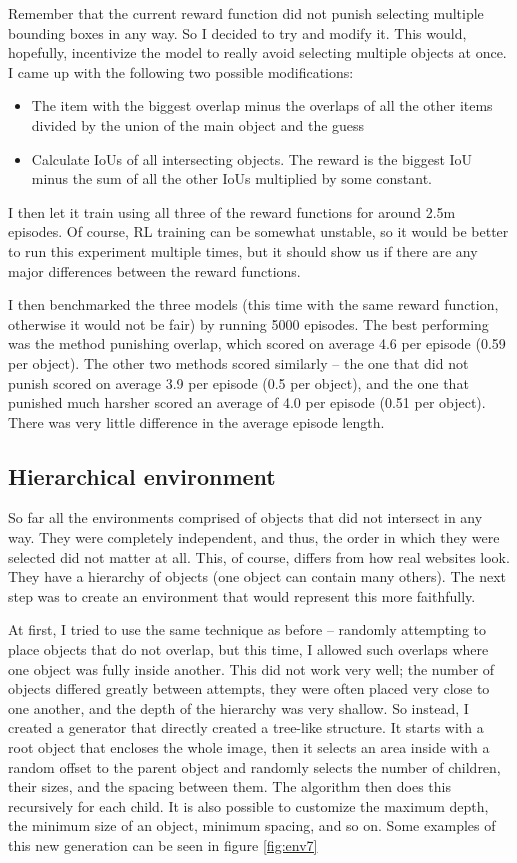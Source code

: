\documentclass[
  digital,     %
  oneside,     %
  nosansbold,  %
  nocolorbold, %
  lof,         %
  lot,         %
]{fithesis4}
\begin{document}
Remember that the current reward function did not punish selecting multiple bounding boxes in any way. So I decided to try and modify it. This would, hopefully, incentivize the model to really avoid selecting multiple objects at once. I came up with the following two possible modifications:
\begin{itemize}
    \item The item with the biggest overlap minus the overlaps of all the other items divided by the union of the main object and the guess
    \item Calculate IoUs of all intersecting objects. The reward is the biggest IoU minus the sum of all the other IoUs multiplied by some constant.
\end{itemize}

I then let it train using all three of the reward functions for around 2.5m episodes. Of course, RL training can be somewhat unstable, so it would be better to run this experiment multiple times, but it should show us if there are any major differences between the reward functions.

I then benchmarked the three models (this time with the same reward function, otherwise it would not be fair) by running 5000 episodes. The best performing was the method punishing overlap, which scored on average 4.6 per episode (0.59 per object). The other two methods scored similarly -- the one that did not punish scored on average 3.9 per episode (0.5 per object), and the one that punished much harsher scored an average of 4.0 per episode (0.51 per object). There was very little difference in the average episode length.

\subsection{Hierarchical environment}

So far all the environments comprised of objects that did not intersect in any way. They were completely independent, and thus, the order in which they were selected did not matter at all. This, of course, differs from how real websites look. They have a hierarchy of objects (one object can contain many others). The next step was to create an environment that would represent this more faithfully.

At first, I tried to use the same technique as before -- randomly attempting to place objects that do not overlap, but this time, I allowed such overlaps where one object was fully inside another. This did not work very well; the number of objects differed greatly between attempts, they were often placed very close to one another, and the depth of the hierarchy was very shallow. So instead, I created a generator that directly created a tree-like structure. It starts with a root object that encloses the whole image, then it selects an area inside with a random offset to the parent object and randomly selects the number of children, their sizes, and the spacing between them. The algorithm then does this recursively for each child. It is also possible to customize the maximum depth, the minimum size of an object, minimum spacing, and so on. Some examples of this new generation can be seen in figure \ref{fig:env7}
\end{document}
